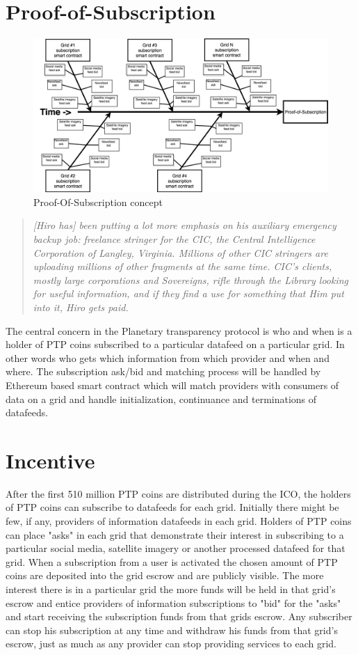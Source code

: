 \documentclass[aps,prl,preprint,groupedaddress]{revtex4}
\begin{document}
\section{Proof-of-Subscription}
\begin{figure}[!h]
\includegraphics[width=0.8\linewidth]{Proof-of-Subsription__1_.png}%
\caption{Proof-Of-Subscription concept}
\end{figure}

\blockquote{\it{[Hiro has] been putting a lot more emphasis on his auxiliary emergency backup job: freelance stringer for the CIC, the Central Intelligence Corporation of Langley, Virginia. Millions of other CIC stringers are uploading millions of other fragments at the same time. CIC's clients, mostly large corporations and Sovereigns, rifle through the Library looking for useful information, and if they find a use for something that Him put into it, Hiro gets paid.}\cite{stephenson2014snow}}




The central concern in the Planetary transparency protocol is who and when is a holder of PTP coins subscribed to a particular datafeed on a particular grid. In other words who gets which information from which provider and when and where. The subscription ask/bid and matching process will be handled by Ethereum based smart contract which will match providers with consumers of data on a grid and handle initialization, continuance and terminations of datafeeds.  





\section{Incentive}
After the first 510 million PTP coins are distributed during the ICO, the holders of PTP coins can subscribe to datafeeds for each grid. Initially there might be few, if any, providers of information datafeeds in each grid. Holders of PTP coins can place "asks" in each grid that demonstrate their interest in subscribing to a particular social media, satellite imagery or another processed datafeed for that grid. When a subscription from a user is activated the chosen amount of PTP coins are deposited into the grid escrow and are publicly visible. The more interest there is in a particular grid the more funds will be held in that grid's escrow and entice providers of information subscriptions to "bid" for the "asks" and start receiving the subscription funds from that grids escrow. Any subscriber can stop his subscription at any time and withdraw his funds from that grid's escrow, just as much as any provider can stop providing services to each grid. 
\end{document}
